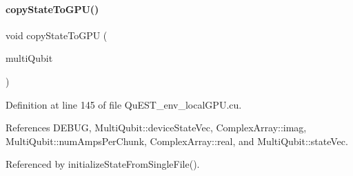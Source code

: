 \paragraph{\texorpdfstring{copy\+State\+To\+G\+P\+U()}{copyStateToGPU()}}
{\footnotesize\ttfamily void copy\+State\+To\+G\+PU (\begin{DoxyParamCaption}\item[{\mbox{\hyperlink{structMultiQubit}{Multi\+Qubit}}}]{multi\+Qubit }\end{DoxyParamCaption})}



Definition at line 145 of file Qu\+E\+S\+T\+\_\+env\+\_\+local\+G\+P\+U.\+cu.



References D\+E\+B\+UG, Multi\+Qubit\+::device\+State\+Vec, Complex\+Array\+::imag, Multi\+Qubit\+::num\+Amps\+Per\+Chunk, Complex\+Array\+::real, and Multi\+Qubit\+::state\+Vec.



Referenced by initialize\+State\+From\+Single\+File().


